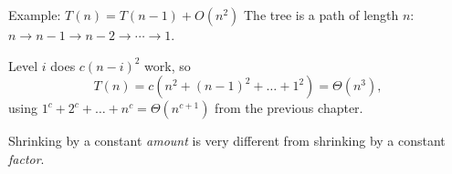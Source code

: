 \documentclass[10pt,aspectratio=169]{beamer}
\begin{document}
\begin{frame}{Example: $T(n) = T(n-1) + O(n^2)$}
  The tree is a \alert{path} of length $n$: \; $n \to n-1 \to n-2 \to \cdots \to 1$.

  \bigskip
  Level $i$ does $c(n-i)^2$ work, so
  \[
    T(n) = c\left(n^2 + (n-1)^2 + \ldots + 1^2\right) = \Theta(n^3),
  \]
  using $1^c + 2^c + \ldots + n^c = \Theta(n^{c+1})$ from the previous chapter.

  \bigskip
  \begin{center}
    \small Shrinking by a constant \emph{amount} is very different from shrinking by a constant \emph{factor}.
  \end{center}
\end{frame}
\end{document}
